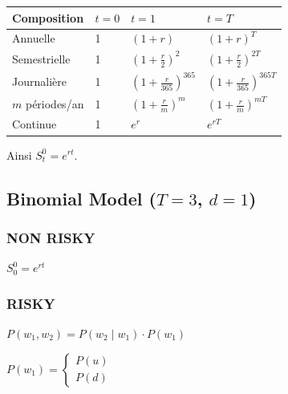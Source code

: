 \documentclass[12pt,a4paper]{article}
\numberwithin{equation}{section}
\theoremstyle{plain} %
\theoremstyle{definition} %
\theoremstyle{remark} %
\theoremstyle{myexample}
\theoremstyle{definition}
\begin{document}
\begin{center}
\begin{tabular}{l|lll}
\textbf{Composition} & $t=0$ & $t=1$ & $t=T$ \\
\hline
Annuelle & 1 & $(1+r)$ & $(1+r)^T$ \\
Semestrielle & 1 & $\left(1+\frac{r}{2}\right)^2$ & $\left(1+\frac{r}{2}\right)^{2T}$ \\
Journalière & 1 & $\left(1+\frac{r}{365}\right)^{365}$ & $\left(1+\frac{r}{365}\right)^{365T}$ \\
$m$ périodes/an & 1 & $\left(1+\frac{r}{m}\right)^m$ & $\left(1+\frac{r}{m}\right)^{mT}$ \\
Continue & 1 & $e^r$ & $e^{rT}$ \\
\end{tabular}
\end{center}

Ainsi $S_t^0 = e^{rt}$.

\subsection{Binomial Model ($T=3$, $d=1$)}

\subsubsection*{NON RISKY}
$S_0^0 = e^{rt}$

\subsubsection*{RISKY}
$P(w_1, w_2) = P(w_2 \mid w_1) \cdot P(w_1)$

$P(w_1) = \begin{cases}
P(u) \\
P(d)
\end{cases}$

\vspace{1cm}
\end{document}
